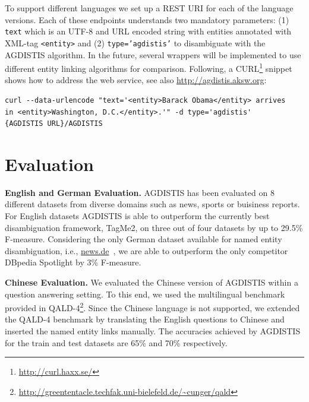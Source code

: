 To support different languages we set up a REST URI for each of the language versions.
Each of these endpoints understands two mandatory parameters: (1) \texttt{text} which is an UTF-8 and URL encoded string with entities annotated with XML-tag \texttt{<entity>} and (2) \texttt{type='agdistis'} to disambiguate with the AGDISTIS algorithm.
In the future, several wrappers will be implemented to use different entity linking algorithms for comparison.
Following, a CURL\footnote{\url{http://curl.haxx.se/}} snippet shows how to address the web service, see also \url{http://agdistis.aksw.org}:
\begin{verbatim}
curl --data-urlencode "text='<entity>Barack Obama</entity> arrives 
in <entity>Washington, D.C.</entity>.'" -d type='agdistis' 
{AGDISTIS URL}/AGDISTIS
\end{verbatim}

\section{Evaluation}
\textbf{English and German Evaluation.} AGDISTIS has been evaluated on 8 different datasets from diverse domains such as news, sports or buisiness reports.
For English datasets AGDISTIS is able to outperform the currently best disambiguation framework, TagMe2, on three out of four datasets by up to 29.5\% F-measure. 
Considering the only German dataset available for named entity disambiguation, i.e., \url{news.de}~\cite{n3}, we are able to outperform the only competitor DBpedia Spotlight by 3\% F-measure.


\noindent \textbf{Chinese Evaluation.} We evaluated the Chinese version of AGDISTIS within a question answering setting. 
To this end, we used the multilingual benchmark provided in QALD-4\footnote{\url{http://greententacle.techfak.uni-bielefeld.de/~cunger/qald}}. 
Since the Chinese language is not supported, we extended the QALD-4 benchmark by translating the English questions to Chinese and inserted the named entity links manually.
The accuracies achieved by AGDISTIS for the train and test datasets are 65\% and 70\% respectively. 
